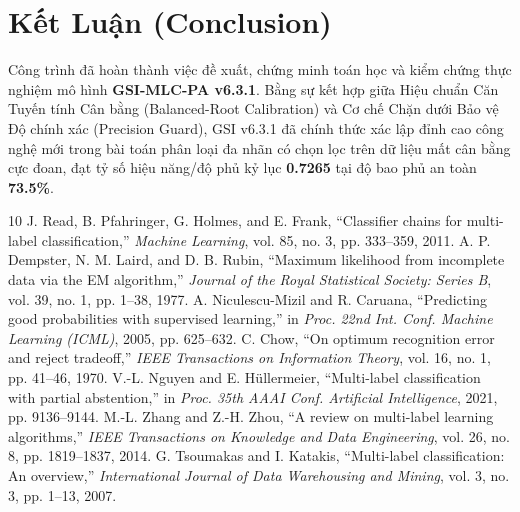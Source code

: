 \documentclass[10pt,a4paper,twoside]{article}
\begin{document}
\section{Kết Luận (Conclusion)}
Công trình đã hoàn thành việc đề xuất, chứng minh toán học và kiểm chứng thực nghiệm mô hình \textbf{GSI-MLC-PA v6.3.1}. Bằng sự kết hợp giữa Hiệu chuẩn Căn Tuyến tính Cân bằng (Balanced-Root Calibration) và Cơ chế Chặn dưới Bảo vệ Độ chính xác (Precision Guard), GSI v6.3.1 đã chính thức xác lập đỉnh cao công nghệ mới trong bài toán phân loại đa nhãn có chọn lọc trên dữ liệu mất cân bằng cực đoan, đạt tỷ số hiệu năng/độ phủ kỷ lục \textbf{0.7265} tại độ bao phủ an toàn \textbf{73.5\%}.
\begin{thebibliography}{10}
 J. Read, B. Pfahringer, G. Holmes, and E. Frank, ``Classifier chains for multi-label classification,'' \textit{Machine Learning}, vol. 85, no. 3, pp. 333--359, 2011.
 A. P. Dempster, N. M. Laird, and D. B. Rubin, ``Maximum likelihood from incomplete data via the EM algorithm,'' \textit{Journal of the Royal Statistical Society: Series B}, vol. 39, no. 1, pp. 1--38, 1977.
 A. Niculescu-Mizil and R. Caruana, ``Predicting good probabilities with supervised learning,'' in \textit{Proc. 22nd Int. Conf. Machine Learning (ICML)}, 2005, pp. 625--632.
 C. Chow, ``On optimum recognition error and reject tradeoff,'' \textit{IEEE Transactions on Information Theory}, vol. 16, no. 1, pp. 41--46, 1970.
 V.-L. Nguyen and E. H{\"u}llermeier, ``Multi-label classification with partial abstention,'' in \textit{Proc. 35th AAAI Conf. Artificial Intelligence}, 2021, pp. 9136--9144.
 M.-L. Zhang and Z.-H. Zhou, ``A review on multi-label learning algorithms,'' \textit{IEEE Transactions on Knowledge and Data Engineering}, vol. 26, no. 8, pp. 1819--1837, 2014.
 G. Tsoumakas and I. Katakis, ``Multi-label classification: An overview,'' \textit{International Journal of Data Warehousing and Mining}, vol. 3, no. 3, pp. 1--13, 2007.
\end{thebibliography}
\end{document}
